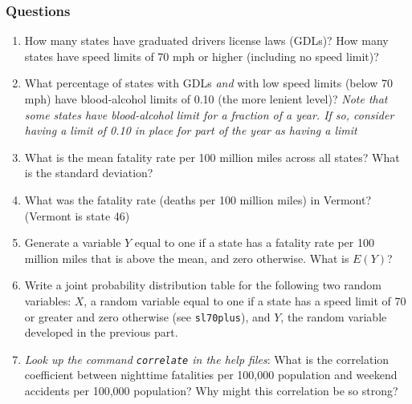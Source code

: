 \documentclass[11pt]{article}
\begin{document}
\hypertarget{questions}{%
\subsubsection*{Questions}\label{questions}}

\begin{enumerate}
\def\labelenumi{\arabic{enumi}.}
\item
  How many states have graduated drivers license laws (GDLs)? How many
  states have speed limits of 70 mph or higher (including no speed
  limit)?
\item
  What percentage of states with GDLs \emph{and} with low speed limits
  (below 70 mph) have blood-alcohol limits of 0.10 (the more lenient
  level)? \emph{Note that some states have blood-alcohol limit for a
  fraction of a year. If so, consider having a limit of 0.10 in place
  for part of the year as having a limit}
\item
  What is the mean fatality rate per 100 million miles across all
  states? What is the standard deviation?
\item
  What was the fatality rate (deaths per 100 million miles) in Vermont?
  (Vermont is state 46)
\item
  Generate a variable \(Y\) equal to one if a state has a fatality rate
  per 100 million miles that is above the mean, and zero otherwise. What
  is \(E(Y)\)?
\item
  Write a joint probability distribution table for the following two
  random variables: \(X\), a random variable equal to one if a state has
  a speed limit of 70 or greater and zero otherwise (see
  \texttt{sl70plus}), and \(Y\), the random variable developed in the
  previous part.
\item
  \emph{Look up the command \texttt{correlate} in the help files}: What
  is the correlation coefficient between nighttime fatalities per
  100,000 population and weekend accidents per 100,000 population? Why
  might this correlation be so strong?
\end{enumerate}
\end{document}
